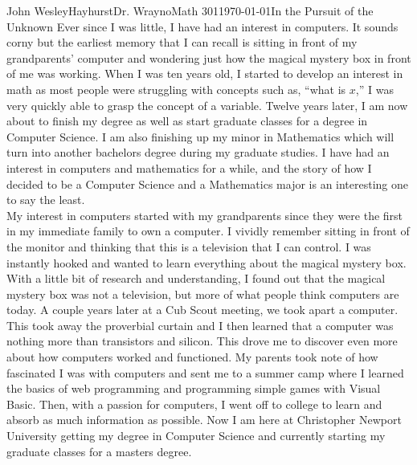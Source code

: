 \documentclass[12pt]{article}
\begin{document}
\begin{mla}{John Wesley}{Hayhurst}{Dr. Wrayno}{Math 301}{\today}{In the Pursuit of the Unknown}
Ever since I was little, I have had an interest in computers. It sounds corny but the earliest memory that I can recall is sitting in front of my grandparents' computer and wondering just how the magical mystery box in front of me was working. When I was ten years old, I started to develop an interest in math as most people were struggling with concepts such as, ``what is $x$,'' I was very quickly able to grasp the concept of a variable. Twelve years later, I am now about to finish my degree as well as start graduate classes for a degree in Computer Science. I am also finishing up my minor in Mathematics which will turn into another bachelors degree during my graduate studies. I have had an interest in computers and mathematics for a while, and the story of how I decided to be a Computer Science and a Mathematics major is an interesting one to say the least.\\

My interest in computers started with my grandparents since they were the first in my immediate family to own a computer. I vividly remember sitting in front of the monitor and thinking that this is a television that I can control. I was instantly hooked and wanted to learn everything about the magical mystery box. With a little bit of research and understanding, I found out that the magical mystery box was not a television, but more of what people think computers are today. A couple years later at a Cub Scout meeting, we took apart a computer. This took away the proverbial curtain and I then learned that a computer was nothing more than transistors and silicon. This drove me to discover even more about how computers worked and functioned. My parents took note of how fascinated I was with computers and sent me to a summer camp where I learned the basics of web programming and programming simple games with Visual Basic. Then, with a passion for computers, I went off to college to learn and absorb as much information as possible. Now I am here at Christopher Newport University getting my degree in Computer Science and currently starting my graduate classes for a masters degree.\\


\end{mla}
\end{document}

